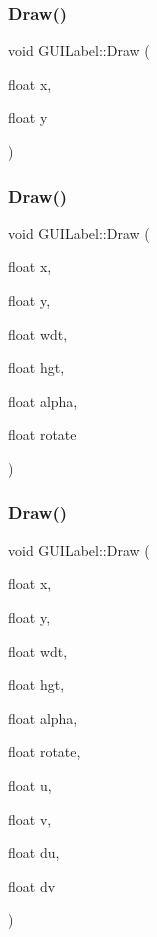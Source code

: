 \subsubsection{\texorpdfstring{Draw()}{Draw()}\hspace{0.1cm}{\footnotesize\ttfamily [1/3]}}
{\footnotesize\ttfamily void G\+U\+I\+Label\+::\+Draw (\begin{DoxyParamCaption}\item[{float}]{x,  }\item[{float}]{y }\end{DoxyParamCaption})}

\hypertarget{class_g_u_i_label_a3bb94d2cefb83f76eb8874930a12e0f4}{}\label{class_g_u_i_label_a3bb94d2cefb83f76eb8874930a12e0f4} 
\subsubsection{\texorpdfstring{Draw()}{Draw()}\hspace{0.1cm}{\footnotesize\ttfamily [2/3]}}
{\footnotesize\ttfamily void G\+U\+I\+Label\+::\+Draw (\begin{DoxyParamCaption}\item[{float}]{x,  }\item[{float}]{y,  }\item[{float}]{wdt,  }\item[{float}]{hgt,  }\item[{float}]{alpha,  }\item[{float}]{rotate }\end{DoxyParamCaption})}

\hypertarget{class_g_u_i_label_af0943185a89553a1eccd44e5dd59524a}{}\label{class_g_u_i_label_af0943185a89553a1eccd44e5dd59524a} 
\subsubsection{\texorpdfstring{Draw()}{Draw()}\hspace{0.1cm}{\footnotesize\ttfamily [3/3]}}
{\footnotesize\ttfamily void G\+U\+I\+Label\+::\+Draw (\begin{DoxyParamCaption}\item[{float}]{x,  }\item[{float}]{y,  }\item[{float}]{wdt,  }\item[{float}]{hgt,  }\item[{float}]{alpha,  }\item[{float}]{rotate,  }\item[{float}]{u,  }\item[{float}]{v,  }\item[{float}]{du,  }\item[{float}]{dv }\end{DoxyParamCaption})}

